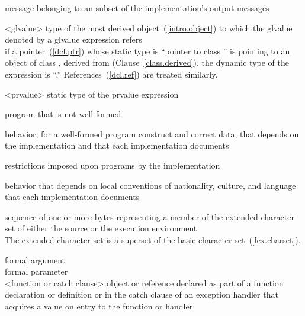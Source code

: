 %
message belonging to an  subset of the
implementation's output messages

%
<glvalue> type of the most derived object~(\ref{intro.object}) to which the
glvalue denoted by a glvalue expression refers\\
\enterexample
if a pointer~(\ref{dcl.ptr})  whose static type is ``pointer to
class '' is pointing to an object of class , derived
from  (Clause~\ref{class.derived}), the dynamic type of the
expression  is ``.'' References~(\ref{dcl.ref}) are
treated similarly.
\exitexample

%
<prvalue> static type of the prvalue expression

%
program that is not well formed

%
behavior, for a well-formed program construct and correct data, that
depends on the implementation and that each implementation documents

%
restrictions imposed upon programs by the implementation

%
behavior that depends on local conventions of nationality, culture, and
language that each implementation documents

%
sequence of one or more bytes representing a member of the extended
character set of either the source or the execution environment\\
\enternote The
extended character set is a superset of the basic character
set~(\ref{lex.charset}).\exitnote

%
%
%
formal argument\\
formal parameter\\
<function or catch clause> object or reference declared as part of a function declaration or
definition or in the catch clause of an exception handler that
acquires a value on entry to the function or handler


